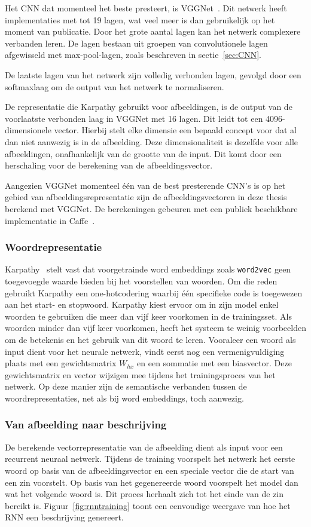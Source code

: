 Het CNN dat momenteel het beste presteert, is VGGNet~\cite{Arge2015}. Dit netwerk heeft implementaties met tot 19 lagen, wat veel meer is dan gebruikelijk op het moment van publicatie. Door het grote aantal lagen kan het netwerk complexere verbanden leren. De lagen bestaan uit groepen van convolutionele lagen afgewisseld met max-pool-lagen, zoals beschreven in sectie~\ref{sec:CNN}.

De laatste lagen van het netwerk zijn volledig verbonden lagen, gevolgd door een softmaxlaag om de output van het netwerk te normaliseren. 

De representatie die Karpathy gebruikt voor afbeeldingen, is de output van de voorlaatste verbonden laag in VGGNet met 16 lagen. Dit leidt tot een 4096-dimensionele vector. Hierbij stelt elke dimensie een bepaald concept voor dat al dan niet aanwezig is in de afbeelding. Deze dimensionaliteit is dezelfde voor alle afbeeldingen, onafhankelijk van de grootte van de input. Dit komt door een herschaling voor de berekening van de afbeeldingsvector.

Aangezien VGGNet momenteel \'e\'en van de best presterende CNN's is op het gebied van afbeeldingsrepresentatie zijn de afbeeldingsvectoren in deze thesis berekend met VGGNet. De berekeningen gebeuren met een publiek beschikbare implementatie in Caffe~\cite{Jia2014}.

\subsubsection{Woordrepresentatie}
Karpathy~\cite{Karpathy2015} stelt vast dat voorgetrainde word embeddings zoals \texttt{word2vec} geen toegevoegde waarde bieden bij het voorstellen van woorden. Om die reden gebruikt Karpathy een one-hotcodering waarbij \'e\'en specifieke code is toegewezen aan het start- en stopwoord. Karpathy kiest ervoor om in zijn model enkel woorden te gebruiken die meer dan vijf keer voorkomen in de trainingsset. Als woorden minder dan vijf keer voorkomen, heeft het systeem te weinig voorbeelden om de betekenis en het gebruik van dit woord te leren. Vooraleer een woord als input dient voor het neurale netwerk, vindt eerst nog een vermenigvuldiging plaats met een gewichtsmatrix $W_{hx}$ en een sommatie met een biasvector. Deze gewichtsmatrix en vector wijzigen mee tijdens het trainingsproces van het netwerk. Op deze manier zijn de semantische verbanden tussen de woordrepresentaties, net als bij word embeddings, toch aanwezig.

\subsubsection{Van afbeelding naar beschrijving}
De berekende vectorrepresentatie van de afbeelding dient als input voor een recurrent neuraal netwerk. Tijdens de training voorspelt het netwerk het eerste woord op basis van de afbeeldingsvector en een speciale vector die de start van een zin voorstelt. Op basis van het gegenereerde woord voorspelt het model dan wat het volgende woord is. Dit proces herhaalt zich tot het einde van de zin bereikt is. Figuur~\ref{fig:rnntraining} toont een eenvoudige weergave van hoe het RNN een beschrijving genereert.

